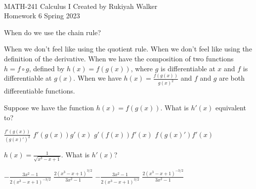\documentclass[addpoints, 12pt]{exam}%
\newcommand{\spc}{\vspace*{0.5cm}}
\begin{document}
\noindent \hrulefill \\
	MATH-241 Calculus I \hfill Created by Rukiyah Walker\\
	Homework 6 \hfill Spring 2023\\ \vspace*{-1cm}
 
	\noindent\hrulefill


\begin{questions}

\vspace*{0.5cm}

\question[1]

When do we use the chain rule?

\begin{choices}
\choice When we don't feel like using the quotient rule.
\choice When we don't feel like using the definition of the derivative.
\CorrectChoice When we have the composition of two functions $h = f \circ g$, defined by $h(x) = f(g(x))$, where $g$ is differentiable at $x$ and $f$ is differentiable at $g(x)$.
\choice When we have $h(x) = \frac{f(g(x))}{g(x)^2}$ and $f$ and $g$ are both differentiable functions. 
\end{choices}

\spc

\question[1]

Suppose we have the function $h(x) = f(g(x))$. What is $h'(x)$ equivalent to?

\begin{multicols}{2}
\begin{choices}
\choice $\displaystyle\frac{f'(g(x))}{(g(x)')^2}$
\CorrectChoice $f'(g(x))g'(x)$
\choice $g'(f(x))f'(x)$
\choice $f(g(x)')f'(x)$
\end{choices}
\end{multicols}

\spc

\question[1]

$h(x) = \frac{1}{\sqrt{x^3 - x + 1}}$. What is $h'(x)$?

\begin{multicols}{2}
\begin{choices}
\choice $\displaystyle-\frac{3x^2 - 1}{2(x^3 - x + 1)^{-3/2}}$
\choice $\displaystyle\frac{2(x^3 - x + 1)^{3/2}}{3x^2 - 1}$
\CorrectChoice $\displaystyle-\frac{3x^2 - 1}{2(x^3 - x + 1)^{3/2}}$
\choice $\displaystyle\frac{2(x^3 - x + 1)^{-3/2}}{3x^2 - 1}$
\end{choices}
\end{multicols}



\end{questions}
\end{document}
